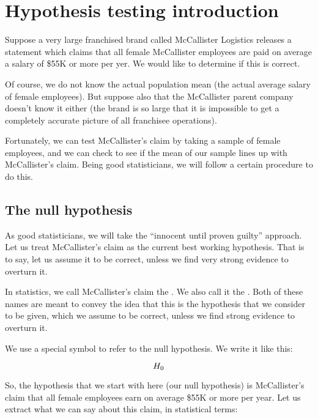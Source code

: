\documentclass[../../../main.tex]{subfiles}
\begin{document}
\chapter{Hypothesis testing introduction}

Suppose a very large franchised brand called McCallister Logistics releases a statement which claims that all female McCallister employees are paid on average a salary of \$55K or more per yer. We would like to determine if this is correct. 

Of course, we do not know the actual population mean (the actual average salary of female employees). But suppose also that the McCallister parent company doesn't know it either (the brand is so large that it is impossible to get a completely accurate picture of all franchisee operations).

Fortunately, we can test McCallister's claim by taking a sample of female employees, and we can check to see if the mean of our sample lines up with McCallister's claim. Being good statisticians, we will follow a certain procedure to do this.


\section{The null hypothesis}

As good statisticians, we will take the ``innocent until proven guilty'' approach. Let us treat McCallister's claim as the current best working hypothesis. That is to say, let us assume it to be correct, unless we find very strong evidence to overturn it. 

In statistics, we call McCallister's claim the . We also call it the . Both of these names are meant to convey the idea that this is the hypothesis that we consider to be given, which we assume to be correct, unless we find strong evidence to overturn it.

We use a special symbol to refer to the null hypothesis. We write it like this:

\begin{equation*}
  \NullHyp/
\end{equation*}

\noindent
So, the hypothesis that we start with here (our null hypothesis) is McCallister's claim that all female employees earn on average \$55K or more per year. Let us extract what we can say about this claim, in statistical terms:
\end{document}
